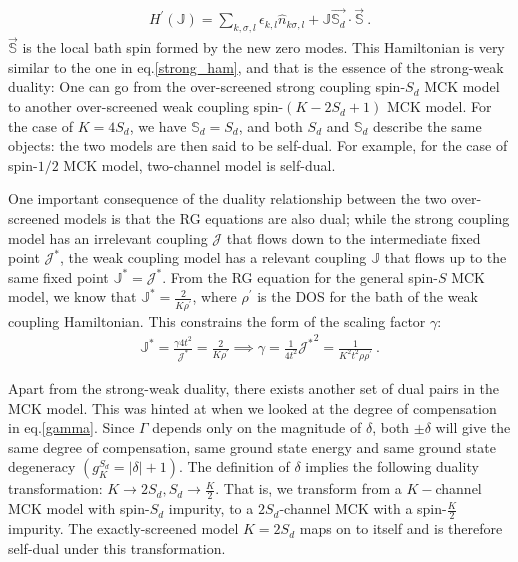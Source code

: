 \documentclass[reprint,prb,superscriptaddress]{revtex4-2}
\begin{document}
\begin{equation}\begin{aligned}
	H^\prime(\mathbb{J}) = \sum_{k,\sigma,l}\epsilon_{k,l} \hat n_{k\sigma,l} + \mathbb{J} \vec{\mathbb{S}_d}\cdot\vec{\mathbb{S}}~.
\end{aligned}\end{equation}
$\vec{\mathbb{S}}$ is the local bath spin formed by the new zero modes. This Hamiltonian is very similar to the one in eq.\eqref{strong_ham}, and that is the essence of the strong-weak duality: One can go from the over-screened strong coupling spin-\(S_{d}\) MCK model to another over-screened weak coupling spin-\((K-2S_{d}+1)\) MCK model. For the case of \(K=4S_{d}\), we have \(\mathbb{S}_d = S_d\), and both \(S_d\) and \(\mathbb{S}_d\) describe the same objects: the two models are then said to be self-dual. For example, for the case of spin-$1/2$ MCK model, two-channel model is self-dual.

One important consequence of the duality relationship between the two over-screened models is that the RG equations are also dual; while the strong coupling model has an irrelevant coupling \(\mathcal{J}\) that flows down to the intermediate fixed point \({\mathcal{J}^*}\), the weak coupling model has a relevant coupling \(\mathbb{J}\) that flows up to the same fixed point \({\mathbb{J}}^* = {\mathcal{J}^*}\). From the RG equation for the general spin-\(S\) MCK model, we know that \({\mathbb{J}}^* = \frac{2}{K \rho^\prime}\), where \(\rho^\prime\) is the DOS for the bath of the weak coupling Hamiltonian. This constrains the form of the scaling factor \(\gamma\):
\begin{equation}\begin{aligned}
	{\mathbb{J}}^* = \frac{\gamma 4t^2}{{\mathcal{J}^*}} = \frac{2}{K \rho^\prime} \implies \gamma = \frac{1}{4t^2} {{\mathcal{J}^*}}^2 = \frac{1}{K^2 t^2 \rho \rho^\prime}~.
\end{aligned}\end{equation}

Apart from the strong-weak duality, there exists another set of dual pairs in the MCK model. This was hinted at when we looked at the degree of compensation in eq.\eqref{gamma}. Since \(\Gamma\) depends only on the magnitude of \(\delta\), both \(\pm \delta\) will give the same degree of compensation, same ground state energy and same ground state degeneracy \(\left(g^{S_d}_K = |\delta|+1\right)\). The definition of \(\delta\) implies the following duality transformation: \(K \to 2S_d, S_d \to \frac{K}{2}\). That is, we transform from a \(K-\)channel MCK model with spin-\(S_d\) impurity, to a \(2S_d\)-channel MCK with a spin-\(\frac{K}{2}\) impurity. The exactly-screened model \(K=2S_d\) maps on to itself and is therefore self-dual under this transformation.
\end{document}

